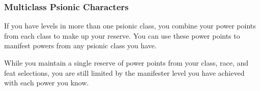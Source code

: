 \subsubsection{Multiclass Psionic Characters}
If you have levels in more than one psionic class, you combine your power points from each class to make up your reserve. You can use these power points to manifest powers from any psionic class you have.

While you maintain a single reserve of power points from your class, race, and feat selections, you are still limited by the manifester level you have achieved with each power you know.













